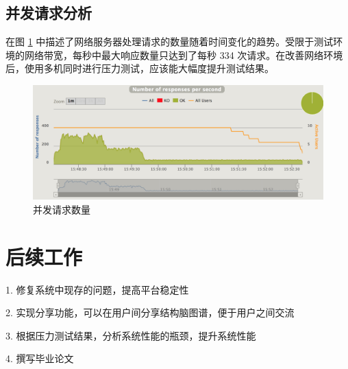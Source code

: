\subsection{并发请求分析}
在图 \ref{request} 中描述了网络服务器处理请求的数量随着时间变化的趋势。受限于测试环境的网络带宽，每秒中最大响应数量只达到了每秒 334 次请求。在改善网络环境后，使用多机同时进行压力测试，应该能大幅度提升测试结果。

\begin{figure}
\centering
\includegraphics[width=148mm]{images/request}
\caption{并发请求数量}
\label{request}
\end{figure}

\section{后续工作}
1. 修复系统中现存的问题，提高平台稳定性

2. 实现分享功能，可以在用户间分享结构脑图谱，便于用户之间交流

3. 根据压力测试结果，分析系统性能的瓶颈，提升系统性能

4. 撰写毕业论文


{
\renewcommand{\chapter}[2]{\section*{#2}\addcontentsline{toc}{section}{#2}}

}